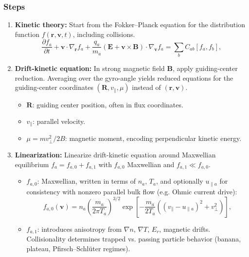 \documentclass[10pt]{book}
\begin{document}
\subsubsection{Steps}
\begin{enumerate}
  \item \textbf{Kinetic theory:} Start from the Fokker--Planck equation for the distribution function $f(\mathbf{r},\mathbf{v},t)$, including collisions.
    \begin{equation}
        \frac{\partial f_a}{\partial t}
        + \mathbf{v} \cdot \nabla_{\mathbf{r}} f_a
        + \frac{q_a}{m_a} \left( \mathbf{E} + \mathbf{v} \times \mathbf{B} \right) \cdot \nabla_{\mathbf{v}} f_a
        = \sum_b C_{ab}[f_a, f_b],
    \end{equation}

  \item \textbf{Drift-kinetic equation:} In strong magnetic field $\mathbf{B}$, apply guiding-center reduction. Averaging over the gyro-angle yields reduced equations for the guiding-center coordinates $(\mathbf{R}, v_{\parallel}, \mu)$ instead of $(\mathbf{r}, \mathbf{v})$.
  \begin{itemize}
    \item $\mathbf{R}$: guiding center position, often in flux coordinates.
    \item $v_{\parallel}$: parallel velocity.
    \item $\mu = m v_{\perp}^2 / 2B$: magnetic moment, encoding perpendicular kinetic energy.
  \end{itemize}

  \item \textbf{Linearization:} Linearize drift-kinetic equation around Maxwellian equilibrium $f_a = f_{a,0} + f_{a,1}$ with $f_{a,0}$ Maxwellian and $f_{a,1} \ll f_{a,0}$.
  \begin{itemize}
    \item $f_{a,0}$: Maxwellian, written in terms of $n_a$, $T_a$, and optionally $u_{\parallel a}$ for consistency with nonzero parallel bulk flow (e.g. Ohmic current drive):
        \begin{equation}
        f_{a,0}(\mathbf{v}) = n_a \left( \frac{m_a}{2\pi T_a} \right)^{3/2}
        \exp\!\left[
        - \frac{m_a}{2T_a} \left( (v_{\parallel} - u_{\parallel a})^2 + v_{\perp}^2 \right)
        \right],
        \end{equation}

    \item $f_{a,1}$: introduces anisotropy from $\nabla n$, $\nabla T$, $E_r$, magnetic drifts. Collisionality determines trapped vs. passing particle behavior (banana, plateau, Pfirsch--Schl\"uter regimes).
  \end{itemize}


\end{enumerate}
\end{document}
